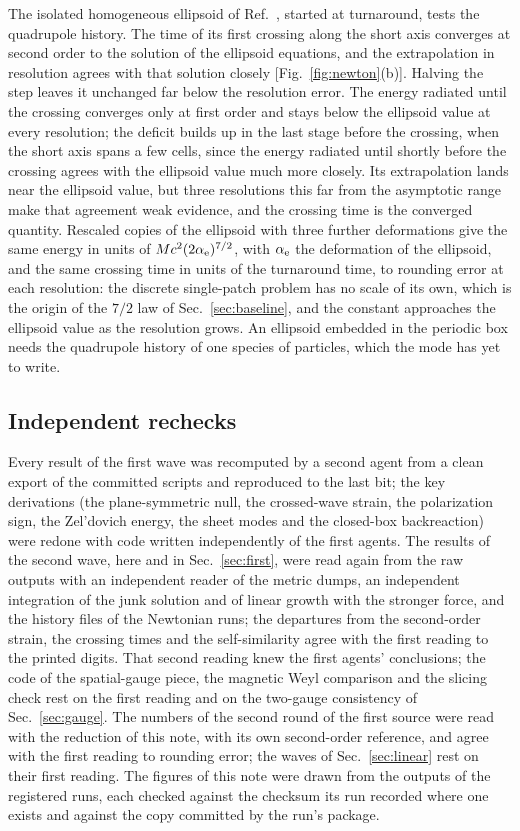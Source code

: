 \documentclass[aps,prd,twocolumn,10pt,superscriptaddress,nofootinbib,longbibliography,floatfix]{revtex4-2}
\begin{document}
The isolated homogeneous ellipsoid of Ref.~\cite{Escriva:2026gw}, started at turnaround, tests the quadrupole history. The time of its first crossing along the short axis converges at second order to the solution of the ellipsoid equations, and the extrapolation in resolution agrees with that solution closely [Fig.~\ref{fig:newton}(b)]. Halving the step leaves it unchanged far below the resolution error. The energy radiated until the crossing converges only at first order and stays below the ellipsoid value at every resolution; the deficit builds up in the last stage before the crossing, when the short axis spans a few cells, since the energy radiated until shortly before the crossing agrees with the ellipsoid value much more closely. Its extrapolation lands near the ellipsoid value, but three resolutions this far from the asymptotic range make that agreement weak evidence, and the crossing time is the converged quantity. Rescaled copies of the ellipsoid with three further deformations give the same energy in units of $Mc^2(2\alpha_{\rm e})^{7/2}$, with $\alpha_{\rm e}$ the deformation of the ellipsoid, and the same crossing time in units of the turnaround time, to rounding error at each resolution: the discrete single-patch problem has no scale of its own, which is the origin of the $7/2$ law of Sec.~\ref{sec:baseline}, and the constant approaches the ellipsoid value as the resolution grows. An ellipsoid embedded in the periodic box needs the quadrupole history of one species of particles, which the mode has yet to write.

\subsection{Independent rechecks}\label{sec:recheck}

Every result of the first wave was recomputed by a second agent from a clean export of the committed scripts and reproduced to the last bit; the key derivations (the plane-symmetric null, the crossed-wave strain, the polarization sign, the Zel'dovich energy, the sheet modes and the closed-box backreaction) were redone with code written independently of the first agents. The results of the second wave, here and in Sec.~\ref{sec:first}, were read again from the raw outputs with an independent reader of the metric dumps, an independent integration of the junk solution and of linear growth with the stronger force, and the history files of the Newtonian runs; the departures from the second-order strain, the crossing times and the self-similarity agree with the first reading to the printed digits. That second reading knew the first agents' conclusions; the code of the spatial-gauge piece, the magnetic Weyl comparison and the slicing check rest on the first reading and on the two-gauge consistency of Sec.~\ref{sec:gauge}. The numbers of the second round of the first source were read with the reduction of this note, with its own second-order reference, and agree with the first reading to rounding error; the waves of Sec.~\ref{sec:linear} rest on their first reading. The figures of this note were drawn from the outputs of the registered runs, each checked against the checksum its run recorded where one exists and against the copy committed by the run's package.
\end{document}
